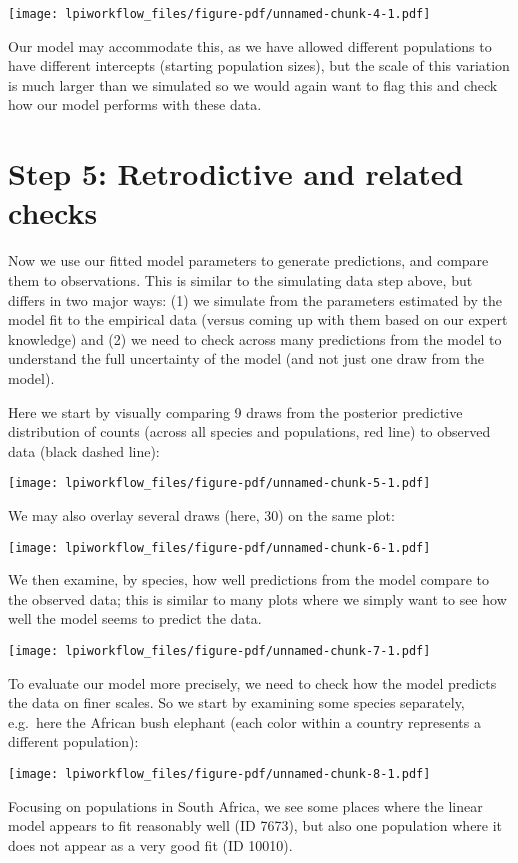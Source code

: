 \documentclass[
  letterpaper,
  DIV=11,
  numbers=noendperiod]{scrartcl}
\begin{document}
\texttt{[image: lpiworkflow\_files/figure-pdf/unnamed-chunk-4-1.pdf]}

Our model may accommodate this, as we have allowed different populations
to have different intercepts (starting population sizes), but the scale
of this variation is much larger than we simulated so we would again
want to flag this and check how our model performs with these data.

\section{Step 5: Retrodictive and related
checks}\label{step-5-retrodictive-and-related-checks}

Now we use our fitted model parameters to generate predictions, and
compare them to observations. This is similar to the simulating data
step above, but differs in two major ways: (1) we simulate from the
parameters estimated by the model fit to the empirical data (versus
coming up with them based on our expert knowledge) and (2) we need to
check across many predictions from the model to understand the full
uncertainty of the model (and not just one draw from the model).

Here we start by visually comparing 9 draws from the posterior
predictive distribution of counts (across all species and populations,
red line) to observed data (black dashed line):

\texttt{[image: lpiworkflow\_files/figure-pdf/unnamed-chunk-5-1.pdf]}

We may also overlay several draws (here, 30) on the same plot:

\texttt{[image: lpiworkflow\_files/figure-pdf/unnamed-chunk-6-1.pdf]}

We then examine, by species, how well predictions from the model compare
to the observed data; this is similar to many plots where we simply want
to see how well the model seems to predict the data.

\texttt{[image: lpiworkflow\_files/figure-pdf/unnamed-chunk-7-1.pdf]}

To evaluate our model more precisely, we need to check how the model
predicts the data on finer scales. So we start by examining some species
separately, e.g.~here the African bush elephant (each color within a
country represents a different population):

\texttt{[image: lpiworkflow\_files/figure-pdf/unnamed-chunk-8-1.pdf]}

Focusing on populations in South Africa, we see some places where the
linear model appears to fit reasonably well (ID 7673), but also one
population where it does not appear as a very good fit (ID 10010).
\end{document}
